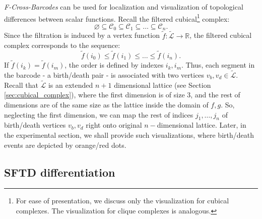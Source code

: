 \documentclass[runningheads]{llncs}
\newcommand{\argmax}{\mathop{\mathrm{argmax}}}
\begin{document}
\textit{F-Cross-Barcodes} can be used for localization and visualization of topological differences between scalar functions. Recall the filtered cubical\footnote{For ease of presentation, we discuss only the visualization for cubical complexes. The visualization for clique complexes is analogous.} complex:
$$
\varnothing \subseteq \mathcal{C}_0 \subseteq \mathcal{C}_1 \subseteq \ldots \subseteq \mathcal{C}_n.
$$
Since the filtration is induced by a vertex function $\tilde{f} : \tilde{\mathcal{L}} \to \mathbb{R}$, the filtered cubical complex corresponds to the sequence:
$$
\tilde{f}(i_0) \le \tilde{f}(i_1) \le \ldots \le \tilde{f}(i_n).
$$
If $\tilde{f}(i_k) = \tilde{f}(i_m)$, the order is defined by indexes $i_k, i_m$.
Thus, each segment in the barcode - a birth/death pair - is associated with two vertices $v_b, v_d \in \tilde{\mathcal{L}}$. 
Recall that $\tilde{\mathcal{L}}$ is an extended $n+1$ dimensional lattice (see Section \ref{sec:cubical_complex}), where the first dimension is of size 3, and the rest of dimensions are of the same size as the lattice inside the domain of $f, g$. 
So, neglecting the first dimension, we can map the rest of indices $j_1, \ldots, j_n$ of birth/death vertices $v_b, v_d$ right onto original $n-$dimensional lattice.
Later, in the experimental section, we shall provide such visualizations, where birth/death events are depicted by orange/red dots.


\subsection{SFTD differentiation}
\end{document}
